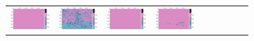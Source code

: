 \documentclass{ipol}
\begin{document}
\begin{figure}[ht]
\begin{subfigure}[t]{\linewidth}
\begin{tabular}{ccccccccc}
                \includegraphics[width=\s]{images/windmill/DCB/iso_64_grids.png}&
                \includegraphics[width=\s]{images/windmill/DHT/iso_64_grids.png}&
                \includegraphics[width=\s]{images/windmill/LINEAR/iso_64_grids.png}&
                \includegraphics[width=\s]{images/windmill/PPG/iso_64_grids.png}&

\end{tabular}
\end{subfigure}
\end{figure}
\end{document}
